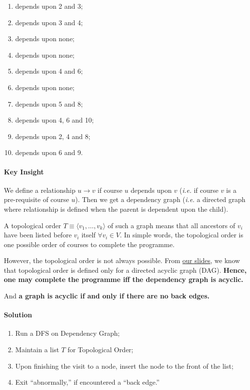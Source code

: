 \documentclass[11pt]{article}
\begin{document}
\begin{enumerate}
\item depends upon 2 and 3;
\item depends upon 3 and 4;
\item depends upon none;
\item depends upon none;
\item depends upon 4 and 6;
\item depends upon none;
\item depends upon 5 and 8;
\item depends upon 4, 6 and 10;
\item depends upon 2, 4 and 8;
\item depends upon 6 and 9.
\end{enumerate}

\paragraph*{Key Insight}
\label{sec:org5a39456}
We define a relationship \(u\to v\) if course \(u\) depends
upon \(v\) (\emph{i.e.} if course \(v\) is a pre-requisite of
course \(u\)).  Then we get a dependency graph (\emph{i.e.} a
directed graph where relationship is defined when the
parent is dependent upon the child).

A topological order \(T\equiv\langle v_{1},\ldots,v_{k}
\rangle\) of such a graph means that all ancestors of
\(v_{i}\) have been listed before \(v_{i}\) itself \(\forall
v_{i}\in V\).  In simple words, the topological order is
one possible order of courses to complete the
programme.

However, the topological order is not always possible.
From \href{https://docs.google.com/presentation/d/14PY-Sc50QsFxdUqZk7GlYVwwEXzO38rg9z9KKx5ti0k/edit\#slide=id.g32a7028b731\_0\_377}{our slides}, we know that topological order is
defined only for a directed acyclic graph (DAG).
\textbf{Hence, one may complete the programme iff the
dependency graph is acyclic.}

And \textbf{a graph is acyclic if and only if there are no
back edges.}

\paragraph*{Solution}
\label{sec:orgae5a43e}
\begin{enumerate}
\item Run a DFS on Dependency Graph;
\item Maintain a list \(T\) for Topological Order;
\item Upon finishing the visit to a node, insert the node
to the front of the list;
\item Exit ``abnormally,'' if encountered a ``back edge.''
\end{enumerate}
\end{document}
